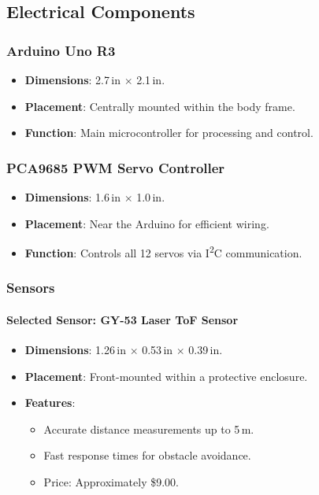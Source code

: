 \documentclass{article}
\begin{document}
\subsection{Electrical Components}

\subsubsection{Arduino Uno R3}

\begin{itemize}
    \item \textbf{Dimensions}: 2.7\,in $\times$ 2.1\,in.
    \item \textbf{Placement}: Centrally mounted within the body frame.
    \item \textbf{Function}: Main microcontroller for processing and control.
\end{itemize}

\subsubsection{PCA9685 PWM Servo Controller}

\begin{itemize}
    \item \textbf{Dimensions}: 1.6\,in $\times$ 1.0\,in.
    \item \textbf{Placement}: Near the Arduino for efficient wiring.
    \item \textbf{Function}: Controls all 12 servos via I\textsuperscript{2}C communication.
\end{itemize}

\subsubsection{Sensors}

\paragraph{Selected Sensor: GY-53 Laser ToF Sensor}

\begin{itemize}
    \item \textbf{Dimensions}: 1.26\,in $\times$ 0.53\,in $\times$ 0.39\,in.
    \item \textbf{Placement}: Front-mounted within a protective enclosure.
    \item \textbf{Features}:
    \begin{itemize}
        \item Accurate distance measurements up to 5\,m.
        \item Fast response times for obstacle avoidance.
        \item Price: Approximately \$9.00.
    \end{itemize}
\end{itemize}
\end{document}
